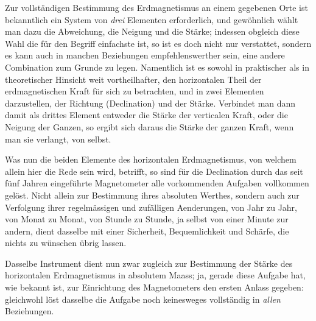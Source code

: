 Zur vollständigen Bestimmung des Erdmagnetismus an einem gegebenen Orte ist bekanntlich ein System von \textit{drei} Elementen erforderlich, und gewöhnlich wählt man dazu die Abweichung, die Neigung und die Stärke; indessen obgleich diese Wahl die für den Begriff einfachste ist, so ist es doch nicht nur verstattet, sondern es kann auch in manchen Beziehungen empfehlenswerther sein, eine andere Combination zum Grunde zu legen. Namentlich ist es sowohl in praktischer als in theoretischer Hinsicht weit vortheilhafter, den horizontalen Theil der erdmagnetischen Kraft für sich zu betrachten, und in zwei Elementen darzustellen, der Richtung (Declination) und der Stärke. Verbindet man dann damit als drittes Element entweder die Stärke der verticalen Kraft, oder die Neigung der Ganzen, so ergibt sich daraus die Stärke der ganzen Kraft, wenn man sie verlangt, von selbst.

Was nun die beiden Elemente des horizontalen Erdmagnetismus, von welchem allein hier die Rede sein wird, betrifft, so sind für die Declination durch das seit fünf Jahren eingeführte Magnetometer alle vorkommenden Aufgaben vollkommen gelöst. Nicht allein zur Bestimmung ihres absoluten Werthes, sondern auch zur Verfolgung ihrer regelmässigen und zufälligen Aenderungen, von Jahr zu Jahr, von Monat zu Monat, von Stunde zu Stunde, ja selbst von einer Minute zur andern, dient dasselbe mit einer Sicherheit, Bequemlichkeit und Schärfe, die nichts zu wünschen übrig lassen.

Dasselbe Instrument dient nun zwar zugleich zur Bestimmung der Stärke des horizontalen Erdmagnetismus in absolutem Maass; ja, gerade diese Aufgabe hat, wie bekannt ist, zur Einrichtung des Magnetometers den ersten Anlass gegeben: gleichwohl löst dasselbe die Aufgabe noch keinesweges vollständig in \textit{allen} Beziehungen.

